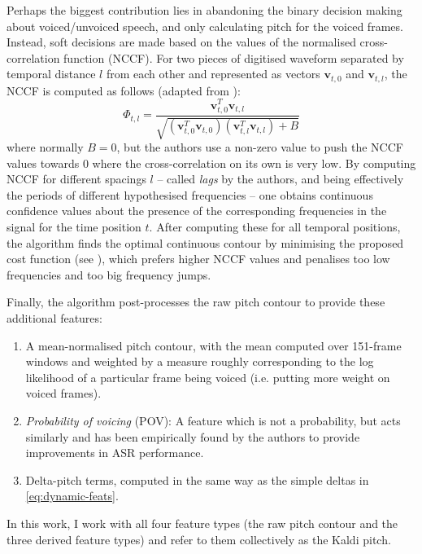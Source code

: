 \documentclass[bsc,frontabs,twoside,singlespacing,parskip,deptreport]{infthesis}
\begin{document}
{{{      %
      Perhaps the biggest contribution lies in abandoning the binary decision making about voiced/unvoiced speech, and only calculating pitch for the voiced frames. Instead, soft decisions are made based on the values of the normalised cross-correlation function (NCCF). For two pieces of digitised waveform separated by temporal distance $l$ from each other and represented as vectors $\mathbf{v}_{t, 0}$ and $\mathbf{v}_{t, l}$, the NCCF is computed as follows (adapted from \citeauthor[Eq. 2]{Ghahremani_et_al_2014}):
      \begin{equation}
        \label{eq:nccf}
        \Phi_{t, l} = \frac{\mathbf{v}_{t, 0}^T \mathbf{v}_{t, l}}{\sqrt{(\mathbf{v}_{t, 0}^T \mathbf{v}_{t, 0})(\mathbf{v}_{t, l}^T \mathbf{v}_{t, l})+B}}
      \end{equation}
      where normally $B=0$, but the authors use a non-zero value to push the NCCF values towards 0 where the cross-correlation on its own is very low. By computing NCCF for different spacings $l$  -- called \textit{lags} by the authors, and being effectively the periods of different hypothesised frequencies -- one obtains continuous confidence values about the presence of the corresponding frequencies in the signal for the time position $t$. After computing these for all temporal positions, the algorithm finds the optimal continuous contour by minimising the proposed cost function (see \citeauthor[Eq. 4]{Ghahremani_et_al_2014}), which prefers higher NCCF values and penalises too low frequencies and too big frequency jumps.

      Finally, the algorithm post-processes the raw pitch contour to provide these additional features:
      \begin{enumerate}
        \item {A mean-normalised pitch contour, with the mean computed over 151-frame windows and weighted by a measure roughly corresponding to the log likelihood of a particular frame being voiced (i.e. putting more weight on voiced frames).}
        \item {\textit{Probability of voicing} (POV): A feature which is not a probability, but acts similarly and has been empirically found by the authors to provide improvements in ASR performance.}
        \item {Delta-pitch terms, computed in the same way as the simple deltas in \autoref{eq:dynamic-feats}.}
      \end{enumerate}
      In this work, I work with all four feature types (the raw pitch contour and the three derived feature types) and refer to them collectively as the Kaldi pitch.
    }

}}
\end{document}
